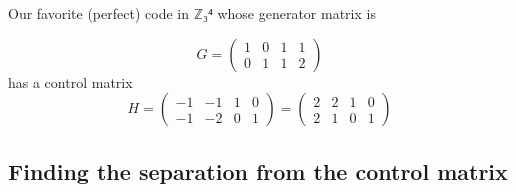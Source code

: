 \documentclass[english]{lbscript}
\begin{document}
\begin{example}{}{}
	Our favorite (perfect) code in \(ℤ₃⁴\) whose generator matrix is

	\begin{equation}
		\label{eq:144}
		G= \begin{pmatrix}
			1 & 0 & 1 & 1 \\
			0 & 1 & 1 & 2
		\end{pmatrix}
	\end{equation}
	has a control matrix
	\begin{equation}
		\label{eq:145}
		H = \begin{pmatrix} -1&-1&1&0\\-1&-2&0&1 \end{pmatrix}
		= \begin{pmatrix}
			2 & 2 & 1 & 0 \\
			2 & 1 & 0 & 1
		\end{pmatrix}
	\end{equation}
\end{example}

\subsection{Finding the separation from the control matrix}
\label{sec:find-separ-from}
\end{document}
